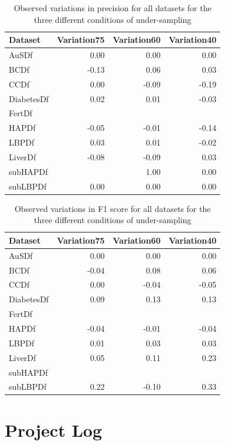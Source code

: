 \begin{table}[ht]
\centering
\begin{tabular}{lrrr}
  \hline
  \rowcolor{LightCyan}
Dataset & Variation75 & Variation60 & Variation40 \\ 
  \hline
AuSDf & 0.00 & 0.00 & 0.00 \\ 
  BCDf & -0.13 & 0.06 & 0.03 \\ 
  CCDf & 0.00 & -0.09 & -0.19 \\ 
  DiabetesDf & 0.02 & 0.01 & -0.03 \\ 
  FertDf &  &  &  \\ 
  HAPDf & -0.05 & -0.01 & -0.14 \\ 
  LBPDf & 0.03 & 0.01 & -0.02 \\ 
  LiverDf & -0.08 & -0.09 & 0.03 \\ 
  subHAPDf &  & 1.00 & 0.00 \\ 
  subLBPDf & 0.00 & 0.00 & 0.00 \\ 
   \hline
\end{tabular}
\caption{Observed variations in precision for all datasets for the three different conditions of under-sampling}
\end{table}

\begin{table}[ht]
\centering
\begin{tabular}{lrrr}
  \hline
  \rowcolor{LightCyan}
Dataset & Variation75 & Variation60 & Variation40 \\ 
  \hline
AuSDf & 0.00 & 0.00 & 0.00 \\ 
  BCDf & -0.04 & 0.08 & 0.06 \\ 
  CCDf & 0.00 & -0.04 & -0.05 \\ 
  DiabetesDf & 0.09 & 0.13 & 0.13 \\ 
  FertDf &  &  &  \\ 
  HAPDf & -0.04 & -0.01 & -0.04 \\ 
  LBPDf & 0.01 & 0.03 & 0.03 \\ 
  LiverDf & 0.05 & 0.11 & 0.23 \\ 
  subHAPDf &  &  &  \\ 
  subLBPDf & 0.22 & -0.10 & 0.33 \\ 
   \hline
\end{tabular}
\caption{Observed variations in F1 score for all datasets for the three different conditions of under-sampling}
\end{table}



 

\chapter{Project Log}







